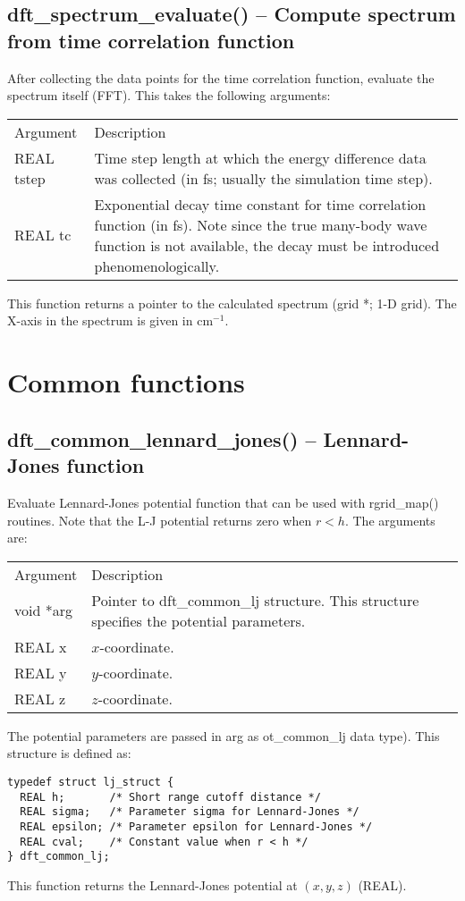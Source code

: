 \documentclass[12pt,letterpaper]{report}
\begin{document}
\subsection{dft\_spectrum\_evaluate() -- Compute spectrum from time correlation function}

After collecting the data points for the time correlation function, evaluate the spectrum itself (FFT). This takes the following arguments:
\begin{longtable}{p{} p{}}
Argument & Description\\
\cline{1-2}
REAL tstep & Time step length at which the energy difference data was collected (in fs; usually the simulation time step).\\
REAL tc & Exponential decay time constant for time correlation function (in fs). Note since the true many-body wave function is not available, the decay must be introduced phenomenologically.\\
\end{longtable}
\noindent
This function returns a pointer to the calculated spectrum (grid *; 1-D grid). The X-axis in the spectrum is given in cm$^{-1}$.

\section{Common functions}

\subsection{dft\_common\_lennard\_jones() -- Lennard-Jones function}

Evaluate Lennard-Jones potential function that can be used with rgrid\_map() routines. Note that the L-J potential returns zero when $r < h$. The arguments are:
\begin{longtable}{p{} p{}}
Argument & Description\\
\cline{1-2}
void *arg & Pointer to dft\_common\_lj structure. This structure specifies the potential parameters.\\
REAL x & $x$-coordinate.\\
REAL y & $y$-coordinate.\\
REAL z & $z$-coordinate.\\
\end{longtable}
\noindent 
The potential parameters are passed in arg as ot\_common\_lj data type). This structure is defined as:
\begin{verbatim}
typedef struct lj_struct {
  REAL h;       /* Short range cutoff distance */
  REAL sigma;   /* Parameter sigma for Lennard-Jones */
  REAL epsilon; /* Parameter epsilon for Lennard-Jones */
  REAL cval;    /* Constant value when r < h */
} dft_common_lj;
\end{verbatim}
This function returns the Lennard-Jones potential at $(x,y,z)$ (REAL).
\end{document}
